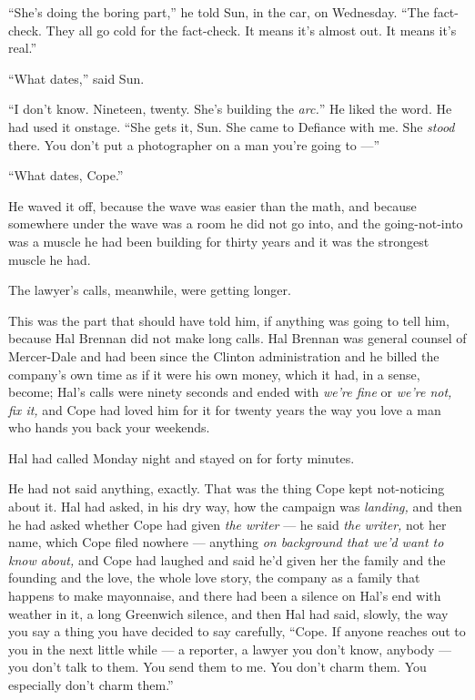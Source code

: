 \documentclass[11pt,openany]{book}
\newcommand{\scenebreak}{\par\vspace{0.5\baselineskip}\begin{center}\textasteriskcentered\quad\textasteriskcentered\quad\textasteriskcentered\end{center}\vspace{0.5\baselineskip}\par}
\begin{document}
``She's doing the boring part,'' he told Sun, in the car, on Wednesday. ``The fact-check. They all go cold for the fact-check. It means it's almost out. It means it's real.''

``What dates,'' said Sun.

``I don't know. Nineteen, twenty. She's building the \textit{arc.}'' He liked the word. He had used it onstage. ``She gets it, Sun. She came to Defiance with me. She \textit{stood} there. You don't put a photographer on a man you're going to ---''

``What dates, Cope.''

He waved it off, because the wave was easier than the math, and because somewhere under the wave was a room he did not go into, and the going-not-into was a muscle he had been building for thirty years and it was the strongest muscle he had.


\scenebreak


The lawyer's calls, meanwhile, were getting longer.

This was the part that should have told him, if anything was going to tell him, because Hal Brennan did not make long calls. Hal Brennan was general counsel of Mercer-Dale and had been since the Clinton administration and he billed the company's own time as if it were his own money, which it had, in a sense, become; Hal's calls were ninety seconds and ended with \textit{we're fine} or \textit{we're not, fix it,} and Cope had loved him for it for twenty years the way you love a man who hands you back your weekends.

Hal had called Monday night and stayed on for forty minutes.

He had not said anything, exactly. That was the thing Cope kept not-noticing about it. Hal had asked, in his dry way, how the campaign was \textit{landing,} and then he had asked whether Cope had given \textit{the writer} --- he said \textit{the writer,} not her name, which Cope filed nowhere --- anything \textit{on background that we'd want to know about,} and Cope had laughed and said he'd given her the family and the founding and the love, the whole love story, the company as a family that happens to make mayonnaise, and there had been a silence on Hal's end with weather in it, a long Greenwich silence, and then Hal had said, slowly, the way you say a thing you have decided to say carefully, ``Cope. If anyone reaches out to you in the next little while --- a reporter, a lawyer you don't know, anybody --- you don't talk to them. You send them to me. You don't charm them. You especially don't charm them.''
\end{document}
